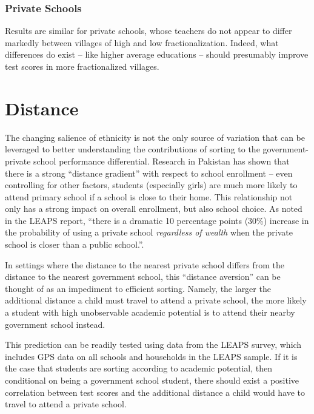 \documentclass[12pt]{article}
\begin{document}


\subsubsection{Private Schools}\label{} 

Results are similar for private schools, whose teachers do not appear to differ markedly between villages of high and low fractionalization. Indeed, what differences do exist -- like higher average educations -- should presumably improve test scores in more fractionalized villages. 




\section{Distance}\label{distance}
The changing salience of ethnicity is not the only source of variation that can be leveraged to better understanding the contributions of sorting to the government-private school performance differential. Research in Pakistan has shown that there is a strong ``distance gradient'' with respect to school enrollment -- even controlling for other factors, students (especially girls) are much more likely to attend primary school if a school is close to their home. This relationship not only has a strong impact on overall enrollment, but also school choice. As noted in the LEAPS report, ``there is a dramatic 10 percentage points (30\%) increase in the probability of using a private school \emph{regardless of wealth} when the private school is closer than a public school.''\citep[p.96]{Andrabi:2007we}. 

In settings where the distance to the nearest private school differs from the distance to the nearest government school, this ``distance aversion'' can be thought of as an impediment to efficient sorting. Namely, the larger the additional distance a child must travel to attend a private school, the more likely a student with high unobservable academic potential is to attend their nearby government school instead.  

This prediction can be readily tested using data from the LEAPS survey, which includes GPS data on all schools and households in the LEAPS sample. If it is the case that students are sorting according to academic potential, then conditional on being a government school student, there should exist a positive correlation between test scores and the additional distance a child would have to travel to attend a private school. 
\end{document}
